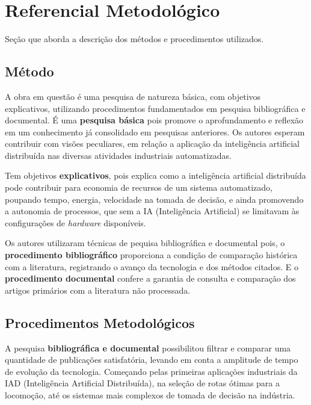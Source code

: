 \documentclass[
	article,			    %
	12pt,				    %
	oneside,			    %
	a4paper,			    %
	chapter=TITLE,		    %
	section=TITLE,		    %
	subsection=TITLE,	    %
	english,			    %
	brazil,				    %
	sumario=tradicional
]{abntex2}
\begin{document}
\section{Referencial Metodológico}
Seção que aborda a descrição dos métodos e procedimentos utilizados.
\subsection{Método}
A obra em questão é uma pesquisa de natureza básica, com objetivos explicativos, utilizando procedimentos fundamentados em pesquisa bibliográfica e documental. É uma \textbf{pesquisa básica} pois promove o aprofundamento e reflexão em um conhecimento já consolidado em pesquisas anteriores. Os autores esperam contribuir com visões peculiares, em relação a aplicação da inteligência artificial distribuída nas diversas atividades industriais automatizadas.

Tem objetivos \textbf{explicativos}, pois explica como a inteligência artificial distribuída pode contribuir para economia de recursos de um sistema automatizado, poupando tempo, energia, velocidade na tomada de decisão, e ainda promovendo a autonomia de processos, que sem a IA (Inteligência Artificial) se limitavam às configurações de \emph{hardware} disponíveis.

Os autores utilizaram técnicas de pequisa bibliográfica e documental pois, o \textbf{procedimento bibliográfico} proporciona a condição de comparação histórica com a literatura, registrando o avanço da tecnologia e dos métodos citados. E o \textbf{procedimento documental} confere a garantia de consulta e comparação dos artigos primários com a literatura não processada.

\subsection{Procedimentos Metodológicos}
A pesquisa \textbf{bibliográfica e documental} possibilitou filtrar e comparar uma quantidade de publicações satisfatória, levando em conta a amplitude de tempo de evolução da tecnologia. Começando pelas primeiras aplicações industriais da IAD (Inteligência Artificial Distribuída), na seleção de rotas ótimas para a locomoção, até os sistemas mais complexos de tomada de decisão na indústria.
\end{document}
